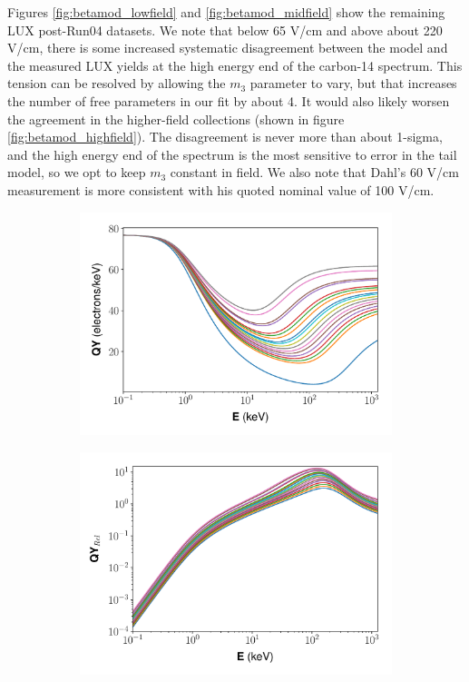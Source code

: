 Figures \ref{fig:betamod_lowfield} and \ref{fig:betamod_midfield} show the remaining LUX post-Run04 datasets. We note that below 65 V/cm and above about 220 V/cm, there is some increased systematic disagreement between the model and the measured LUX yields at the high energy end of the carbon-14 spectrum. This tension can be resolved by allowing the $m_3$ parameter to vary, but that increases the number of free parameters in our fit by about 4. It would also likely worsen the agreement in the higher-field collections (shown in figure \ref{fig:betamod_highfield}). The disagreement is never more than about 1-sigma, and the high energy end of the spectrum is the most sensitive to error in the tail model, so we opt to keep $m_3$ constant in field. We also note that Dahl's 60 V/cm measurement is more consistent with his quoted nominal value of 100 V/cm.
\begin{figure}[!h]
\centering
\begin{subfigure}{0.5\linewidth}
\includegraphics[width=\linewidth]{Figures/Yields_fit_new/NEST_fit_fieldvar_new.pdf}
\caption{}
\end{subfigure}%
\begin{subfigure}{0.5\linewidth}
\includegraphics[width=\linewidth]{Figures/Yields_fit_new/NEST_fit_fieldvar_new_rel.pdf}

\end{subfigure}
\end{figure}
